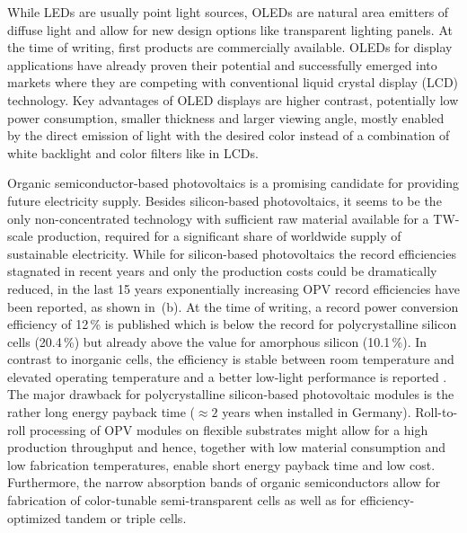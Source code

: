 %
While LEDs are usually point light sources, OLEDs are natural area emitters of diffuse light and allow for new design options like transparent lighting panels. At the time of writing, first products are commercially available.
%
OLEDs for display applications have already proven their potential and successfully emerged into markets where they are competing with conventional liquid crystal display (LCD) technology. Key advantages of OLED displays are higher contrast, potentially low power consumption, smaller thickness and larger viewing angle, mostly enabled by the direct emission of light with the desired color instead of a combination of white backlight and color filters like in LCDs.

Organic semiconductor-based photovoltaics is a promising candidate for providing future electricity supply. Besides silicon-based photovoltaics, it seems to be the only non-concentrated technology with sufficient raw material available for a TW-scale production\cite{Feltrin2008}, required for a significant share of worldwide supply of sustainable electricity.
While for silicon-based photovoltaics the record efficiencies stagnated in recent years and only the production costs could be dramatically reduced, in the last 15 years exponentially increasing OPV record efficiencies have been reported, as shown in \,(b).
%
At the time of writing, a record power conversion efficiency of 12\,\%\cite{Heliatek12.0} 
is published which is below the record for polycrystalline silicon cells (20.4\,\%)\cite{SolarCellEff41} but already above the value for amorphous silicon (10.1\,\%)\cite{SolarCellEff41}.
In contrast to inorganic cells, the efficiency is stable between room temperature and elevated operating temperature and a better low-light performance is reported \cite{Riede2011,Heliatek12.0}.
%
The major drawback for polycrystalline silicon-based photovoltaic modules is the rather long energy payback time (\eg $\approx 2$ years when installed in Germany\cite{PV-Fakten201303}). Roll-to-roll processing of OPV modules on flexible substrates might allow for a high production throughput and hence, together with low material consumption and low fabrication temperatures, enable short energy payback time and low cost\cite{Anctil2012}.
Furthermore, the narrow absorption bands of organic semiconductors allow for fabrication of color-tunable semi-transparent cells as well as for efficiency-optimized tandem or triple cells\cite{Riede2011,Heliatek12.0}.

